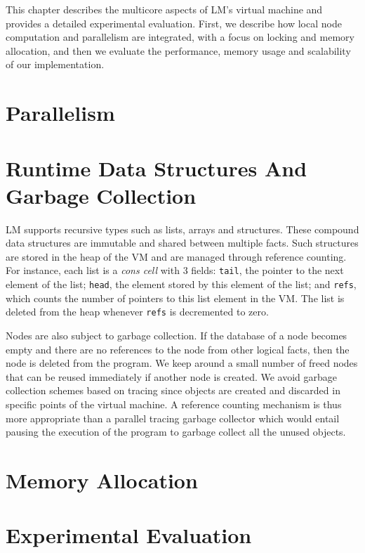 This chapter describes the multicore aspects of LM's virtual machine and
provides a detailed experimental evaluation. First, we describe how local node
computation and parallelism are integrated, with a focus on locking and memory
allocation, and then we evaluate the performance, memory usage and scalability
of our implementation.

\section{Parallelism}\label{sec:implementation:parallelism}



\section{Runtime Data Structures And Garbage Collection}

LM supports recursive types such as lists, arrays and structures. These compound
data structures are immutable and shared between multiple facts. Such structures
are stored in the heap of the VM and are managed through reference counting. For
instance, each list is a \emph{cons cell} with 3 fields: \texttt{tail}, the
pointer to the next element of the list; \texttt{head}, the element stored by
this element of the list; and \texttt{refs}, which counts the number of pointers
to this list element in the VM. The list is deleted from the heap whenever
\texttt{refs} is decremented to zero.

Nodes are also subject to garbage collection. If the database of a node becomes
empty and there are no references to the node from other logical facts, then the
node is deleted from the program. We keep around a small number of freed nodes
that can be reused immediately if another node is created. We avoid garbage
collection schemes based on tracing since objects are created and discarded in
specific points of the virtual machine. A reference counting mechanism is thus
more appropriate than a parallel tracing garbage collector which would entail
pausing the execution of the program to garbage collect all the unused objects.

\section{Memory Allocation}\label{section:implementation:allocation}


\section{Experimental Evaluation}


